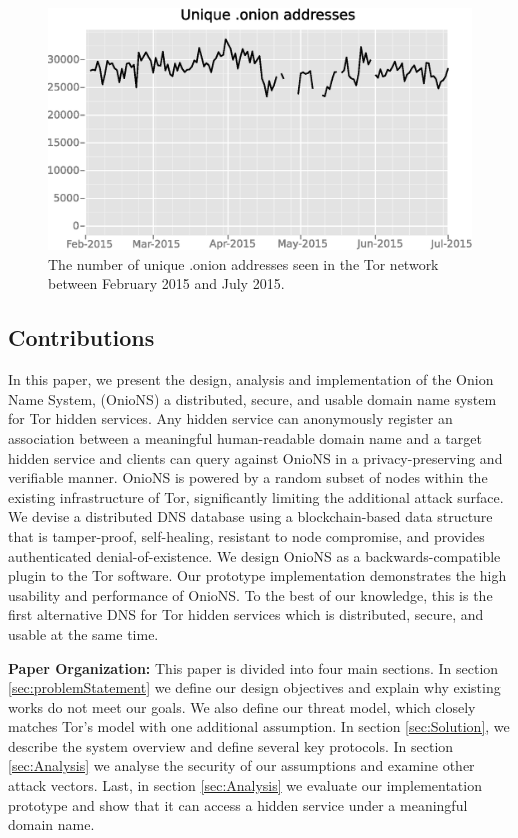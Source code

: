 \documentclass[conference]{IEEEtran}
\begin{document}
\begin{figure}[htbp]
	\centering
	\includegraphics[width=\linewidth]{../assets/images/Tor/onion_2015-02_2015-07.eps}
	\caption{The number of unique .onion addresses seen in the Tor network between February 2015 and July 2015\cite{kadianakis2015extrapolating}\cite{TorMetrics}.}
	\label{fig:OnionCount}
\end{figure}

\subsection{Contributions}

In this paper, we present the design, analysis and implementation of the Onion Name System, (OnioNS) a distributed, secure, and usable domain name system for Tor hidden services. Any hidden service can anonymously register an association between a meaningful human-readable domain name and a target hidden service and clients can query against OnioNS in a privacy-preserving and verifiable manner. OnioNS is powered by a random subset of nodes within the existing infrastructure of Tor, significantly limiting the additional attack surface. We devise a distributed DNS database using a blockchain-based data structure that is tamper-proof, self-healing, resistant to node compromise, and provides authenticated denial-of-existence. We design OnioNS as a backwards-compatible plugin to the Tor software. Our prototype implementation demonstrates the high usability and performance of OnioNS. To the best of our knowledge, this is the first alternative DNS for Tor hidden services which is distributed, secure, and usable at the same time.

\textbf{Paper Organization:} This paper is divided into four main sections. In section \ref{sec:problemStatement} we define our design objectives and explain why existing works do not meet our goals. We also define our threat model, which closely matches Tor's model with one additional assumption. In section \ref{sec:Solution}, we describe the system overview and define several key protocols. In section \ref{sec:Analysis} we analyse the security of our assumptions and examine other attack vectors. Last, in section \ref{sec:Analysis} we evaluate our implementation prototype and show that it can access a hidden service under a meaningful domain name.
\end{document}
